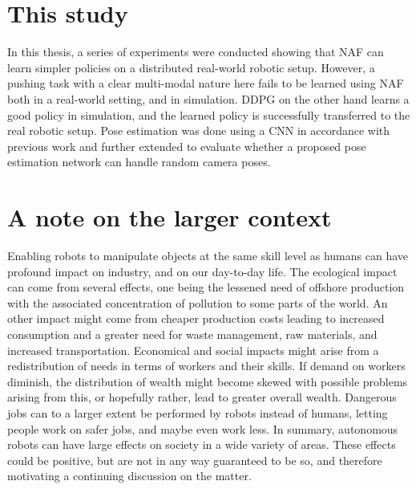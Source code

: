\section{This study}

In this thesis, a series of experiments were conducted showing that NAF can
learn simpler policies on a distributed real-world robotic setup. However, a
pushing task with a clear multi-modal nature here fails to be learned using NAF
both in a real-world setting, and in simulation. DDPG on the other hand learns
a good policy in simulation, and the learned policy is successfully transferred
to the real robotic setup. Pose estimation was done using a CNN in accordance
with previous work \cite{levine2016end,chebotar2016path,yahya2016collective}
and further extended to evaluate whether a proposed pose estimation network can
handle random camera poses.

\section{A note on the larger context}

Enabling robots to manipulate objects at the same skill level as humans can
have profound impact on industry, and on our day-to-day life. The ecological
impact can come from several effects, one being the lessened need of offshore
production with the associated concentration of pollution to some parts of the
world. An other impact might come from cheaper production costs leading to
increased consumption and a greater need for waste management, raw materials,
and increased transportation. Economical and social impacts might arise from a
redistribution of needs in terms of workers and their skills. If demand on
workers diminish, the distribution of wealth might become skewed with possible
problems arising from this, or hopefully rather, lead to greater overall
wealth. Dangerous jobs can to a larger extent be performed by robots instead of
humans, letting people work on safer jobs, and maybe even work less. In
summary, autonomous robots can have large effects on society in a wide variety
of areas. These effects could be positive, but are not in any way guaranteed
to be so, and therefore motivating a continuing discussion on the matter.
